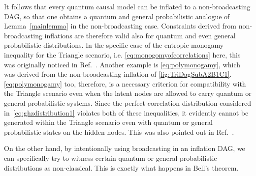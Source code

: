 It follows that every quantum causal model can be inflated to a non-broadcasting DAG, so that one obtains a quantum and general probabilistic analogue of Lemma~\ref{mainlemma} in the non-broadcasting case. Constraints derived from non-broadcasting inflations are therefore valid also for quantum and even general probabilistic distributions. In the specific case of the entropic monogamy inequality for the Triangle scenario, i.e. \cref{eq:monogomyofcorrelations} here, this was originally noticed in Ref.~\cite{pusey2014gdag}. Another example is \cref{eq:polymonogamy}, which was derived from the non-broadcasting inflation of \cref{fig:TriDagSubA2B1C1}. \cref{eq:polymonogamy} too, therefore, is a necessary criterion for compatibility with the Triangle scenario even when the latent nodes are allowed to carry quantum or general probabilistic systems.
Since the perfect-correlation distribution considered in~\cref{eq:ghzdistribution1} violates both of these inequalities, it evidently cannot be generated within the Triangle scenario even with quantum or general probabilistic states on the hidden nodes. This was also pointed out in Ref.~\cite{pusey2014gdag}.


On the other hand, by intentionally using broadcasting in an inflation DAG, we can specifically try to witness certain quantum or general probabilistic distributions as non-classical. This is exactly what happens in Bell's theorem.



